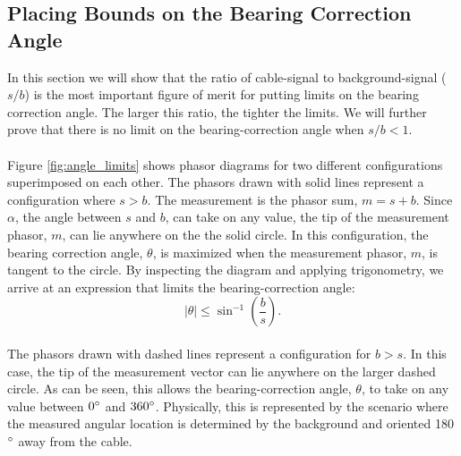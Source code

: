 \documentclass[paper=a4, fontsize=11pt]{scrartcl}
\numberwithin{equation}{section}		%
\numberwithin{figure}{section}			%
\numberwithin{table}{section}				%
\begin{document}
\begin{appendices}
\subsection{Placing Bounds on the Bearing Correction Angle}\label{section:angle_bounds}
In this section we will show that the ratio of cable-signal to background-signal ($s/b$) is the most important figure of merit for putting limits on the bearing correction angle. The larger this ratio, the tighter the limits. We will further prove that there is no limit on the bearing-correction angle when $s/b < 1$.

\paragraph{}
Figure \ref{fig:angle_limits} shows phasor diagrams for two different configurations superimposed on each other.  The phasors drawn with solid lines represent a configuration where $s>b$.  The measurement is the phasor sum, $m=s+b$.  Since $\alpha$, the angle between $s$ and $b$, can take on any value, the tip of the measurement phasor,  $m$, can lie anywhere on the the solid circle.  In this configuration, the bearing correction angle, $\theta$, is maximized when the measurement phasor, $m$, is tangent to the circle.  By inspecting the diagram and applying trigonometry, we arrive at an expression that limits the bearing-correction angle: 
\begin{equation} \label{eq:angle_limits}
    \left| \theta \right| \leq \sin^{-1}\left(\frac{b}{s}\right).
\end{equation}

\paragraph{}
The phasors drawn with dashed lines represent a configuration for $b > s$.  In this case, the tip of the measurement vector can lie anywhere on the larger dashed circle.  As can be seen, this allows the bearing-correction angle, $\theta$, to take on any value between $0\degree$ and $360\degree$.  Physically, this is represented by the scenario where the measured angular location is determined by the background and oriented 180$\degree$ away from the cable. 


\end{appendices}
\end{document}

